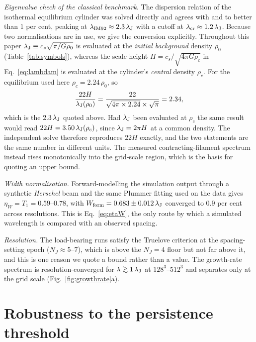 \documentclass[usenatbib,twoside,twocolumn]{mnras}
\begin{document}
\emph{Eigenvalue check of the classical benchmark.} The dispersion relation of the isothermal equilibrium cylinder was solved directly and agrees with \citet{Nagasawa1987} and \citet{Fischera2012} to better than $1$ per cent, peaking at $\lambda_{\rm IM92}\approx2.3\,\lambda_{\rm J}$ with a cutoff at $\lambda_{\rm cr}\approx1.2\,\lambda_{\rm J}$. Because two normalisations are in use, we give the conversion explicitly. Throughout this paper $\lambda_{\rm J}\equiv c_s\sqrt{\pi/G\rho_0}$ is evaluated at the \emph{initial background} density $\rho_0$ (Table~\ref{tab:symbols}), whereas the scale height $H=c_s/\sqrt{4\pi G\rho_c}$ in Eq.~\ref{eq:lambdam} is evaluated at the cylinder's \emph{central} density $\rho_c$. For the equilibrium used here $\rho_c=2.24\,\rho_0$, so
\begin{equation}
\frac{22H}{\lambda_{\rm J}(\rho_0)}=\frac{22}{\sqrt{4\pi\times2.24}\times\sqrt{\pi}}=2.34,
\label{eq:hconv}
\end{equation}
which is the $2.3\,\lambda_{\rm J}$ quoted above. Had $\lambda_{\rm J}$ been evaluated at $\rho_c$ the same result would read $22H=3.50\,\lambda_{\rm J}(\rho_c)$, since $\lambda_{\rm J}=2\pi H$ at a common density. The independent solve therefore reproduces $22H$ exactly, and the two statements are the same number in different units. The measured contracting-filament spectrum instead rises monotonically into the grid-scale region, which is the basis for quoting an upper bound.

\emph{Width normalisation.} Forward-modelling the simulation output through a synthetic \textit{Herschel} beam and the same Plummer fitting used on the data gives $\eta_W=T_1=0.59$--$0.78$, with $W_{\rm form}=0.683\pm0.012\,\lambda_{\rm J}$ converged to $0.9$ per cent across resolutions. This is Eq.~\ref{eq:etaW}, the only route by which a simulated wavelength is compared with an observed spacing.

\emph{Resolution.} The load-bearing runs satisfy the Truelove criterion at the spacing-setting epoch ($N_J\approx5$--$7$), which is above the $N_J=4$ floor but not far above it, and this is one reason we quote a bound rather than a value. The growth-rate spectrum is resolution-converged for $\lambda\gtrsim1\,\lambda_{\rm J}$ at $128^3$--$512^3$ and separates only at the grid scale (Fig.~\ref{fig:growthrate}a).

\section{Robustness to the persistence threshold}
\label{sec:persistence}
\end{document}
